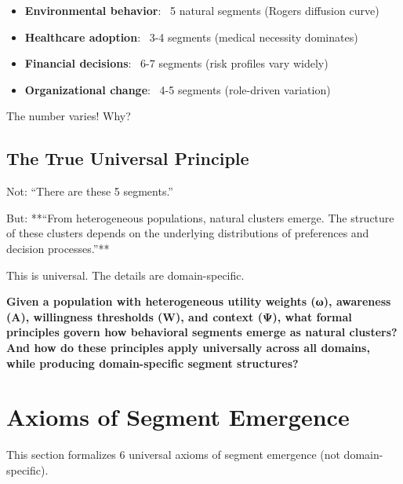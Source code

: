 \begin{itemize}
\item \textbf{Environmental behavior}: ~5 natural segments (Rogers diffusion curve)
\item \textbf{Healthcare adoption}: ~3-4 segments (medical necessity dominates)
\item \textbf{Financial decisions}: ~6-7 segments (risk profiles vary widely)
\item \textbf{Organizational change}: ~4-5 segments (role-driven variation)
\end{itemize}

The number varies! Why?

\subsection{The True Universal Principle}

Not: ``There are these 5 segments.''

But: **``From heterogeneous populations, natural clusters emerge. The structure
of these clusters depends on the underlying distributions of preferences and
decision processes.''**

This is universal. The details are domain-specific.

\begin{tcolorbox}[colback=red!5!white, colframe=red!75!black,
    title=The Fundamental Question]
\textbf{Given a population with heterogeneous utility weights (ω), awareness (A),
willingness thresholds (W), and context (Ψ), what formal principles govern how
behavioral segments emerge as natural clusters? And how do these principles
apply universally across all domains, while producing domain-specific segment
structures?}
\end{tcolorbox}

\section{Axioms of Segment Emergence}
\label{sec:ba-genesis}

This section formalizes 6 universal axioms of segment emergence (not domain-specific).

